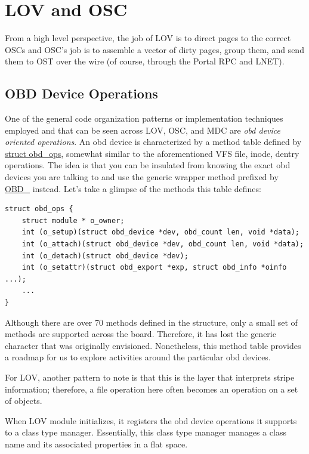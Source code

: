 \section{LOV and OSC}

From a high level perspective, the job of LOV is to direct pages to the correct
OSCs and OSC's job is to assemble a vector of dirty pages, group them, and send them
to OST over the wire (of course, through the Portal RPC and LNET).


\subsection{OBD Device Operations}

One of the general code organization patterns or implementation techniques employed
and that can be seen across LOV, OSC, and MDC are \textit{obd device oriented
operations}. An obd device is characterized by a method table defined by
\url{struct obd_ops}, somewhat similar to the aforementioned VFS file, inode,
dentry operations. The idea is that you can be insulated from knowing the exact
obd devices you are talking to and use the generic wrapper method prefixed by
\url{OBD_} instead.  Let's take a glimpse of the methods this table defines:

\begin{Verbatim}
struct obd_ops {
    struct module * o_owner;
    int (o_setup)(struct obd_device *dev, obd_count len, void *data);
    int (o_attach)(struct obd_device *dev, obd_count len, void *data);
    int (o_detach)(struct obd_device *dev);
    int (o_setattr)(struct obd_export *exp, struct obd_info *oinfo ...);
    ...
}
\end{Verbatim}

Although there are over 70 methods defined in the structure, only a small set
of methods are supported across the board. Therefore, it has lost the
generic character that was originally envisioned. Nonetheless, this method
table provides a roadmap for us to explore activities around the particular obd
devices.

For LOV, another pattern to note is that this is the layer that interprets
stripe information; therefore, a file operation here often becomes an
operation on a set of objects. 

When LOV module initializes, it registers the obd device operations it
supports to a class type manager. Essentially, this class type manager
manages a class name and its associated properties in a flat space.

